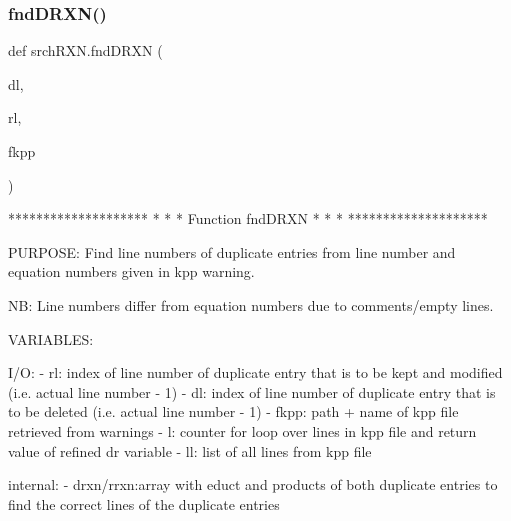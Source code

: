 \subsubsection{\texorpdfstring{fnd\+D\+R\+X\+N()}{fndDRXN()}}
{\footnotesize\ttfamily def srch\+R\+X\+N.\+fnd\+D\+R\+XN (\begin{DoxyParamCaption}\item[{}]{dl,  }\item[{}]{rl,  }\item[{}]{fkpp }\end{DoxyParamCaption})}

\begin{DoxyVerb}********************
*                  *
* Function fndDRXN *
*                  *
********************

PURPOSE:
    Find line numbers of duplicate entries from line number and equation
    numbers given in kpp warning.

NB:
    Line numbers differ from equation numbers due to comments/empty lines.

VARIABLES:

I/O:
    - rl:       index of line number of duplicate entry that is
                to be kept and modified (i.e. actual line number - 1)
    - dl:       index of line number of duplicate entry that is
                to be deleted (i.e. actual line number - 1)
    - fkpp:     path + name of kpp file retrieved from warnings
    - l:        counter for loop over lines in kpp file and return value
                of refined dr variable
    - ll:       list of all lines from kpp file

internal:
    - drxn/rrxn:array with educt and products of both duplicate entries
                to find the correct lines of the duplicate entries
\end{DoxyVerb}
 
